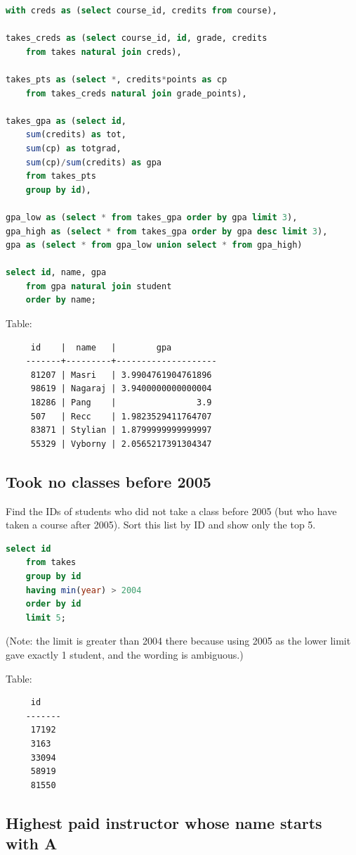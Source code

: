 \documentclass[11pt, oneside]{amsart}   	%
\begin{document}
\begin{lstlisting}[language=SQL]
    with creds as (select course_id, credits from course),

takes_creds as (select course_id, id, grade, credits 
    from takes natural join creds), 

takes_pts as (select *, credits*points as cp 
    from takes_creds natural join grade_points),

takes_gpa as (select id, 
    sum(credits) as tot, 
    sum(cp) as totgrad, 
    sum(cp)/sum(credits) as gpa 
    from takes_pts 
    group by id), 

gpa_low as (select * from takes_gpa order by gpa limit 3), 
gpa_high as (select * from takes_gpa order by gpa desc limit 3), 
gpa as (select * from gpa_low union select * from gpa_high)

select id, name, gpa
    from gpa natural join student
    order by name;
\end{lstlisting}

Table: 
\begin{verbatim}
     id    |  name   |        gpa
    -------+---------+--------------------
     81207 | Masri   | 3.9904761904761896
     98619 | Nagaraj | 3.9400000000000004
     18286 | Pang    |                3.9
     507   | Recc    | 1.9823529411764707
     83871 | Stylian | 1.8799999999999997
     55329 | Vyborny | 2.0565217391304347
\end{verbatim}

\subsection{Took no classes before 2005}

Find the IDs of students who did not take a class before 2005 (but who have taken a course after 2005). Sort this list by ID and show only the top 5.

\begin{lstlisting}[language=SQL]
    select id
    from takes 
    group by id
    having min(year) > 2004
    order by id
    limit 5;
\end{lstlisting}
(Note: the limit is greater than 2004 there because using 2005 as the lower limit gave exactly 1 student, and the wording is ambiguous.)

Table:
\begin{verbatim}
     id
    -------
     17192
     3163
     33094
     58919
     81550
\end{verbatim}

\subsection{Highest paid instructor whose name starts with A}
\end{document}
